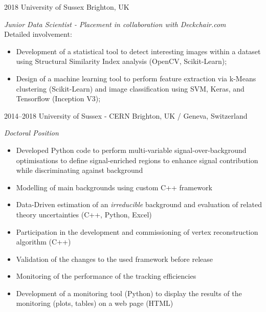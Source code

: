 \documentclass[print]{cv} %
\begin{document}
  \begin{entrylist}
    \entry
    {2018}
    {University of Sussex}
    {Brighton, UK}
    {\emph{Junior Data Scientist - Placement in collaboration with Deckchair.com}
    \\Detailed involvement:
    \begin{itemize}
      \item Development of a statistical tool to detect interesting images within a dataset using Structural Similarity Index analysis (OpenCV, Scikit-Learn);
      \item Design of a machine learning tool to perform feature extraction via k-Means clustering (Scikit-Learn) and image classification using SVM, Keras, and Tensorflow (Inception V3);
    \end{itemize}
    }
  \end{entrylist}

  \begin{entrylist}
    \entry
    {2014--2018}
    {University of Sussex - CERN}
    {Brighton, UK / Geneva, Switzerland}
    {\emph{Doctoral Position}
    \begin{itemize}
      \item Developed Python code to perform multi-variable signal-over-background optimisations to define signal-enriched regions to enhance signal contribution while discriminating against background
      \item Modelling of main backgrounds using custom C++ framework
      \item Data-Driven estimation of an \emph{irreducible} background and evaluation of related theory uncertainties (C++, Python, Excel)
    \end{itemize}%
    \begin{itemize}
      \item Participation in the development and commissioning of vertex reconstruction algorithm (C++)
      \item Validation of the changes to the used framework before release
      \item Monitoring of the performance of the tracking efficiencies
    \end{itemize}%
    \begin{itemize}
      \item Development of a monitoring tool (Python) to display the results of the monitoring (plots, tables) on a web page (HTML)
    \end{itemize}      
    }
  \end{entrylist}
\end{document}
